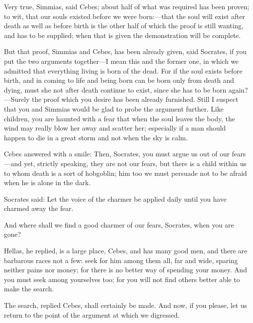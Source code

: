 \documentclass[11pt,letter]{article}
\begin{document}
\par  Very true, Simmias, said Cebes; about half of what was required has been proven; to wit, that our souls existed before we were born:—that the soul will exist after death as well as before birth is the other half of which the proof is still wanting, and has to be supplied; when that is given the demonstration will be complete.

\par  But that proof, Simmias and Cebes, has been already given, said Socrates, if you put the two arguments together—I mean this and the former one, in which we admitted that everything living is born of the dead. For if the soul exists before birth, and in coming to life and being born can be born only from death and dying, must she not after death continue to exist, since she has to be born again?—Surely the proof which you desire has been already furnished. Still I suspect that you and Simmias would be glad to probe the argument further. Like children, you are haunted with a fear that when the soul leaves the body, the wind may really blow her away and scatter her; especially if a man should happen to die in a great storm and not when the sky is calm.

\par  Cebes answered with a smile: Then, Socrates, you must argue us out of our fears—and yet, strictly speaking, they are not our fears, but there is a child within us to whom death is a sort of hobgoblin; him too we must persuade not to be afraid when he is alone in the dark.

\par  Socrates said: Let the voice of the charmer be applied daily until you have charmed away the fear.

\par  And where shall we find a good charmer of our fears, Socrates, when you are gone?

\par  Hellas, he replied, is a large place, Cebes, and has many good men, and there are barbarous races not a few: seek for him among them all, far and wide, sparing neither pains nor money; for there is no better way of spending your money. And you must seek among yourselves too; for you will not find others better able to make the search.

\par  The search, replied Cebes, shall certainly be made. And now, if you please, let us return to the point of the argument at which we digressed.
\end{document}
